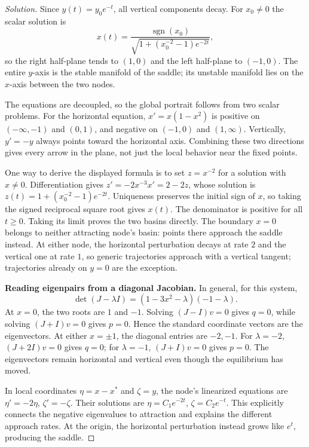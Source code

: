 \documentclass[10pt]{amsart}
\newenvironment{solution}
{\begin{proof}[Solution]}
{\end{proof}}
\begin{document}
\begin{enumerate}[label=\arabic*), leftmargin=*, itemsep=1em]
\begin{solution}
Since $y(t)=y_0e^{-t}$, all vertical components decay. For $x_0\ne0$ the scalar solution is
\[
x(t)=\frac{\operatorname{sgn}(x_0)}{\sqrt{1+(x_0^{-2}-1)e^{-2t}}},
\]
so the right half-plane tends to $(1,0)$ and the left half-plane to $(-1,0)$. The entire $y$-axis is the stable manifold of the saddle; its unstable manifold lies on the $x$-axis between the two nodes.

The equations are decoupled, so the global portrait follows from two scalar problems. For the horizontal equation, $x'=x(1-x^2)$ is positive on $(-\infty,-1)$ and $(0,1)$, and negative on $(-1,0)$ and $(1,\infty)$. Vertically, $y'=-y$ always points toward the horizontal axis. Combining these two directions gives every arrow in the plane, not just the local behavior near the fixed points.

One way to derive the displayed formula is to set $z=x^{-2}$ for a solution with $x\ne0$. Differentiation gives $z'=-2x^{-3}x'=2-2z$, whose solution is $z(t)=1+(x_0^{-2}-1)e^{-2t}$. Uniqueness preserves the initial sign of $x$, so taking the signed reciprocal square root gives $x(t)$. The denominator is positive for all $t\ge0$. Taking its limit proves the two basins directly. The boundary $x=0$ belongs to neither attracting node's basin: points there approach the saddle instead. At either node, the horizontal perturbation decays at rate $2$ and the vertical one at rate $1$, so generic trajectories approach with a vertical tangent; trajectories already on $y=0$ are the exception.


\medskip\noindent\textbf{Reading eigenpairs from a diagonal Jacobian.}
In general, for this system,
\[
\det(J-\lambda I)=(1-3x^2-\lambda)(-1-\lambda).
\]
At $x=0$, the two roots are $1$ and $-1$. Solving $(J-I)v=0$ gives $q=0$, while solving $(J+I)v=0$ gives $p=0$. Hence the standard coordinate vectors are the eigenvectors. At either $x=\pm1$, the diagonal entries are $-2,-1$. For $\lambda=-2$, $(J+2I)v=0$ gives $q=0$; for $\lambda=-1$, $(J+I)v=0$ gives $p=0$. The eigenvectors remain horizontal and vertical even though the equilibrium has moved.

In local coordinates $\eta=x-x^*$ and $\zeta=y$, the node's linearized equations are $\eta'=-2\eta$, $\zeta'=-\zeta$. Their solutions are $\eta=C_1e^{-2t}$, $\zeta=C_2e^{-t}$. This explicitly connects the negative eigenvalues to attraction and explains the different approach rates. At the origin, the horizontal perturbation instead grows like $e^t$, producing the saddle.


\end{solution}
\end{enumerate}
\end{document}

